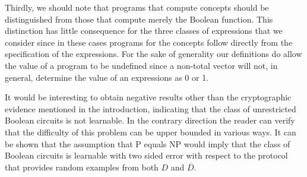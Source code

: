Thirdly, we should note that programs that compute concepts should be distinguished from those that compute merely the Boolean function. This distinction has little consequence for the three classes of expressions that we consider since in these cases programs for the concepts follow directly from the specification of the expressions. For the sake of generality our definitions do allow the value of a program to be undefined since a non-total vector will not, in general, determine the value of an expressions as 0 or 1.

It would be interesting to obtain negative results other than the cryptographic evidence mentioned in the introduction, indicating that the class of unrestricted Boolean circuits is not learnable. In the contrary direction the reader can verify that the difficulty of this problem can be upper bounded in various ways. It can be shown that the assumption that P equals NP would imply that the class of Boolean circuits is learnable with two sided error with respect to the protocol that provides random examples from both $D$ and $\overline{D}$.

